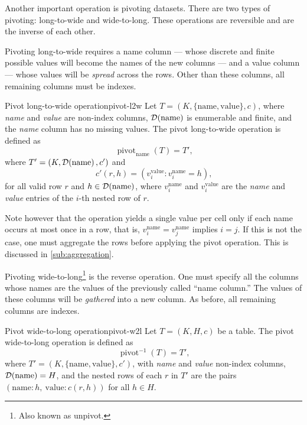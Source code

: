 Another important operation is pivoting datasets.  There are two types of pivoting:
long-to-wide and wide-to-long.  These operations are reversible and are the inverse
of each other.

Pivoting long-to-wide requires a name column --- whose discrete and finite
possible values will become the names of the new columns --- and a value column --- whose
values will be \emph{spread} across the rows.  Other than these columns, all remaining columns
must be indexes.

\begin{defbox}{Pivot long-to-wide operation}{pivot-l2w}
  Let $T = (K, \{\text{name}, \text{value}\}, c)$, where \emph{name} and
  \emph{value} are non-index columns, $\mathcal{D}\!\left(\text{name}\right)$ is enumerable and
  finite, and the \emph{name} column has no missing values. The
  pivot long-to-wide operation is defined as \[
    \operatorname{pivot}_\text{name}(T) = T'\text{,}
  \] where $T' = (K, \mathcal{D}\!\left(\text{name}\right), c')$ and \[
    c'(r, h) = \left( v^{\text{value}}_i : v^{\text{name}}_i = h \right)\text{,}
  \]
  for all valid row $r$ and $h \in \mathcal{D}\!\left(\text{name}\right)$, where
  $v^{\text{name}}_i$ and $v^{\text{value}}_i$ are the \emph{name} and
  \emph{value} entries of the $i$-th nested row of $r$.
\end{defbox}

Note however that the operation yields a single value per cell only if each name
occurs at most once in a row, that is, $v^{\text{name}}_i = v^{\text{name}}_j$
implies $i = j$.  If this is not the case, one must aggregate the rows before
applying the pivot operation.  This is discussed in \cref{sub:aggregation}.

Pivoting wide-to-long\footnote{Also known as unpivot.} is the reverse operation. One must
specify all the columns whose names are the values of the previously called ``name column.''
The values of these columns will be \emph{gathered} into a new column. As before, all
remaining columns are indexes.

\begin{defbox}{Pivot wide-to-long operation}{pivot-w2l}
  Let $T = (K, H, c)$ be a table.  The pivot wide-to-long
  operation is defined as \[
    \operatorname{pivot}^{-1}(T) = T'\text{,}
  \] where $T' = (K, \{\text{name}, \text{value}\}, c')$, with \emph{name} and
  \emph{value} non-index columns, $\mathcal{D}\!\left(\text{name}\right) = H$, and the nested
  rows of each $r$ in $T'$ are the pairs $(\text{name}: h,~\text{value}: c(r, h))$
  for all $h \in H$.
\end{defbox}

